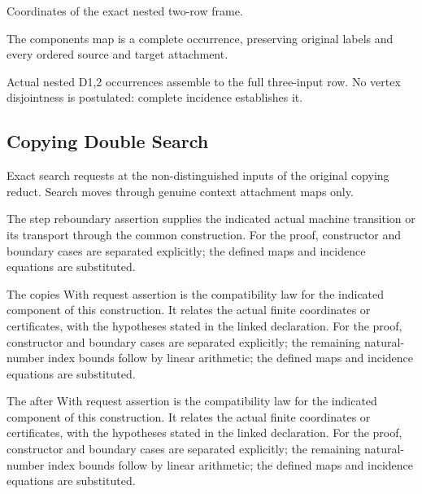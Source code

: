 Coordinates of the exact nested two-row frame.
\par{}

The components map is a complete occurrence, preserving original labels and every ordered source and target attachment.
\par{}

Actual nested D1,2 occurrences assemble to the full three-input row. No vertex disjointness is postulated: complete incidence establishes it.
\par{}

\subsection{Copying Double Search}
Exact search requests at the non-distinguished inputs of the original copying reduct. Search moves through genuine context attachment maps only.

The step reboundary assertion supplies the indicated actual machine transition or its transport through the common construction.
For the proof, constructor and boundary cases are separated explicitly; the defined maps and incidence equations are substituted.
\par{}

The copies With request assertion is the compatibility law for the indicated component of this construction. It relates the actual finite coordinates or certificates, with the hypotheses stated in the linked declaration.
For the proof, constructor and boundary cases are separated explicitly; the remaining natural-number index bounds follow by linear arithmetic; the defined maps and incidence equations are substituted.
\par{}

The after With request assertion is the compatibility law for the indicated component of this construction. It relates the actual finite coordinates or certificates, with the hypotheses stated in the linked declaration.
For the proof, constructor and boundary cases are separated explicitly; the remaining natural-number index bounds follow by linear arithmetic; the defined maps and incidence equations are substituted.
\par{}


